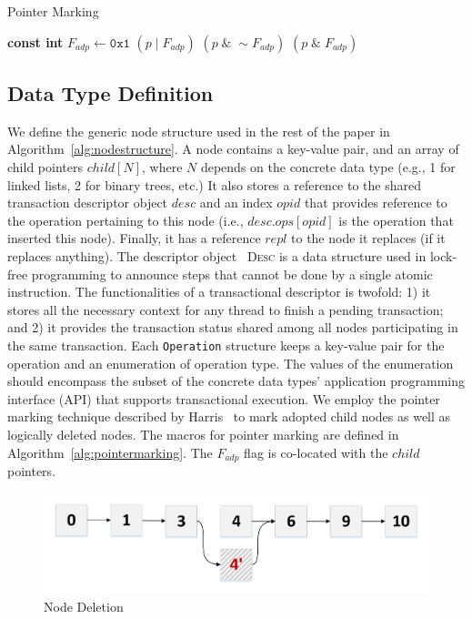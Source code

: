 \documentclass[10pt,conference,compsocconf]{IEEEtran}
\begin{document}
\begin{algorithm}[h]
    \caption{Pointer Marking}
    \label{alg:pointermarking}
    \begin{algorithmic}[1]
        \State \textbf{const int} $F_{adp} \gets \texttt{0x1}$
         $(p\;|\;F_{adp})$
        \EndDefine
         $(p\;\&\;\sim F_{adp})$
        \EndDefine
         $(p\;\&\;F_{adp})$
        \EndDefine
    \end{algorithmic}
\end{algorithm}


\subsection{Data Type Definition}
We define the generic node structure used in the rest of the paper in Algorithm~\ref{alg:nodestructure}. 
A node contains a key-value pair, and an array of child pointers $child[N]$, where $N$ depends on the concrete data type (e.g., 1 for linked lists, 2 for binary trees, etc.)
It also stores a reference to the shared transaction descriptor object $desc$ and an index $opid$ that provides reference to the operation pertaining to this node (i.e., $desc.ops[opid]$ is the operation that inserted this node).
Finally, it has a reference $repl$ to the node it replaces (if it replaces anything).
The descriptor object~\cite{herlihy2012art} \textsc{Desc} is a data structure used in lock-free programming to announce steps that cannot be done by a single atomic instruction.
The functionalities of a transactional descriptor is twofold: 1) it stores all the necessary context for any thread to finish a pending transaction; and 2) it provides the transaction status shared among all nodes participating in the same transaction.
Each \texttt{Operation} structure keeps a key-value pair for the operation and an enumeration of operation type. 
The values of the enumeration should encompass the subset of the concrete data types' application programming interface (API) that supports transactional execution.
We employ the pointer marking technique described by Harris~\cite{harris2001pragmatic} to mark adopted child nodes as well as logically deleted nodes. 
The macros for pointer marking are defined in Algorithm~\ref{alg:pointermarking}.
The $F_{adp}$ flag is co-located with the $child$ pointers.

\begin{figure}[th]
    \centering
    \includegraphics[width=0.8\columnwidth]{figure/deletion.pdf}
    \caption{Node Deletion}
    \label{fig:nodedeletion}
\end{figure}
\end{document}

